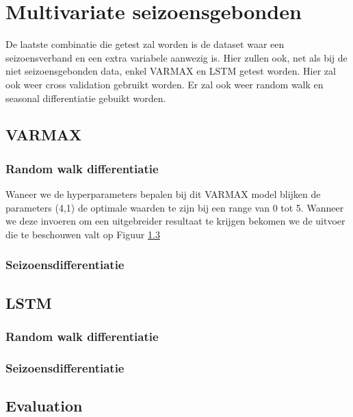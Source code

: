 \section{Multivariate seizoensgebonden}

De laatste combinatie die getest zal worden is de dataset waar een seizoensverband en een extra variabele aanwezig is. Hier zullen ook, net als bij de niet seizoensgebonden data, enkel VARMAX en LSTM getest worden. Hier zal ook weer cross validation gebruikt worden. Er zal ook weer random walk en seasonal differentiatie gebuikt worden.

\subsection{VARMAX}
\subsubsection{Random walk differentiatie}

Waneer we de hyperparameters bepalen bij dit VARMAX model blijken de parameters (4,1) de optimale waarden te zijn bij een range van 0 tot 5. Wanneer we deze invoeren om een uitgebreider resultaat te krijgen bekomen we de uitvoer die te beschouwen valt op Figuur \ref{}

\subsubsection{Seizoensdifferentiatie}

\subsection{LSTM}
\subsubsection{Random walk differentiatie}
\subsubsection{Seizoensdifferentiatie}

\subsection{Evaluation}


